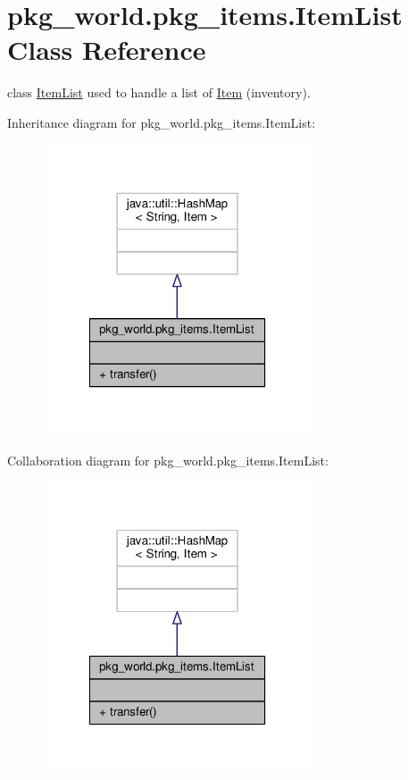 \hypertarget{classpkg__world_1_1pkg__items_1_1ItemList}{\section{pkg\-\_\-world.\-pkg\-\_\-items.\-Item\-List Class Reference}
\label{classpkg__world_1_1pkg__items_1_1ItemList}
}


class \hyperlink{classpkg__world_1_1pkg__items_1_1ItemList}{Item\-List} used to handle a list of \hyperlink{classpkg__world_1_1pkg__items_1_1Item}{Item} (inventory).  




Inheritance diagram for pkg\-\_\-world.\-pkg\-\_\-items.\-Item\-List\-:
\nopagebreak
\begin{figure}[H]
\begin{center}
\leavevmode
\includegraphics[width=226pt]{classpkg__world_1_1pkg__items_1_1ItemList__inherit__graph}
\end{center}
\end{figure}


Collaboration diagram for pkg\-\_\-world.\-pkg\-\_\-items.\-Item\-List\-:
\nopagebreak
\begin{figure}[H]
\begin{center}
\leavevmode
\includegraphics[width=226pt]{classpkg__world_1_1pkg__items_1_1ItemList__coll__graph}
\end{center}
\end{figure}
